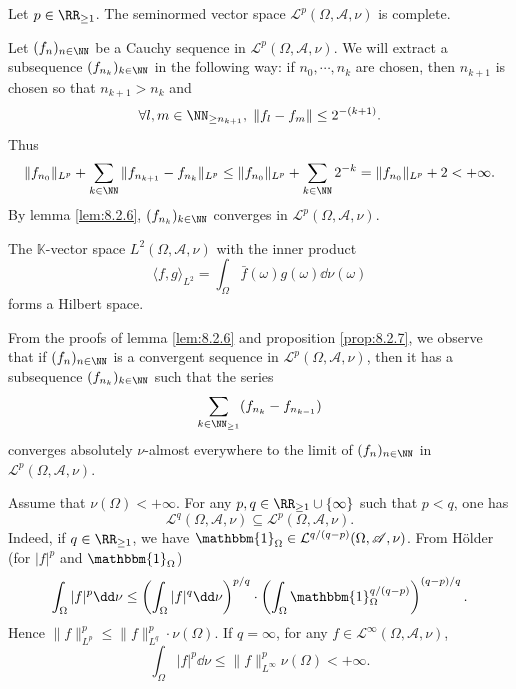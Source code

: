 \begin{propositionenv}\label{prop:8.2.7}
    Let $p \in \RR_{\ge 1}$.
    The seminormed vector space $\mathcal{L}^p(\Omega,\mathscr{A},\nu)$ is complete.
\end{propositionenv}
\begin{proofenv}
    Let $(f_n)_{n \in \NN}$ be a Cauchy sequence in $\mathcal{L}^p(\Omega, \mathscr{A}, \nu)$.
    We will extract a subsequence $(f_{n_{k}})_{k \in \NN}$ in the following way:
    if $n_0,\cdots,n_k$ are chosen, then $n_{k+1}$ is chosen so that $n_{k+1} > n_k$ and
    $$\forall l,m \in \NN_{\ge n_{k+1}}, \; \|f_l - f_m\| \le 2^{-(k+1)}.$$
    Thus
    $$\|f_{n_0}\|_{L^p} + \sum_{k \in \NN} \|f_{n_{k+1}} - f_{n_k}\|_{L^p} \le \|f_{n_0}\|_{L^p} + \sum_{k \in \NN}2^{-k} = \|f_{n_0}\|_{L^p} + 2 < + \infty.$$
    By lemma \ref{lem:8.2.6}, $(f_{n_{k}})_{k \in \NN}$ converges in $\mathcal{L}^p(\Omega,\mathscr{A},\nu)$.
\end{proofenv}

\begin{corollaryenv}
    The $\mathbb{K}$-vector space $L^2(\Omega,\mathscr{A},\nu)$ with the inner product
    $$\langle f,g \rangle_{L^2} = \int_{\Omega} \bar{f}(\omega) g(\omega) \dd \nu(\omega)$$
    forms a Hilbert space.
\end{corollaryenv}
\begin{remark}
    From the proofs of lemma \ref{lem:8.2.6} and proposition \ref{prop:8.2.7},
    we observe that if $(f_n)_{n \in \NN}$ is a convergent sequence in $\mathcal{L}^p(\Omega,\mathscr{A},\nu)$,
    then it has a subsequence $(f_{n_k})_{k \in \NN}$ such that the series
    $$\sum_{k \in \NN_{\ge 1}}(f_{n_{k}} - f_{n_{k-1}})$$
    converges absolutely $\nu$-almost everywhere to the limit of $(f_n)_{n \in \NN}$ in $\mathcal{L}^p(\Omega,\mathscr{A},\nu)$.
\end{remark}

\begin{remark}
    Assume that $\nu(\Omega) < +\infty$.
    For any $p,q \in \RR_{\ge 1} \cup \{\infty\}$ such that $p < q$, one has
    $$\mathcal{L}^q(\Omega,\mathscr{A},\nu) \subseteq \mathcal{L}^p(\Omega,\mathscr{A},\nu).$$
    Indeed, if $q \in \RR_{\ge 1}$, we have $\mathbbm{1}_{\Omega} \in \mathcal{L}^{q/(q - p)}(\Omega,\mathscr{A},\nu)$.
    From Hölder (for $|f|^p$ and $\mathbbm{1}_{\Omega}$)
    $$\int_{\Omega} |f|^p \dd \nu \le \left(\int_{\Omega} |f|^q \dd \nu\right)^{p/q} \cdot \left(\int_{\Omega} \mathbbm{1}_{\Omega}^{q/(q-p)}\right)^{(q-p)/q}.$$
    Hence $\|f\|^{p}_{L^p} \le \|f\|^p_{L^q} \cdot \nu(\Omega)$.
    If $q = \infty$, for any $f \in \mathcal{L}^\infty(\Omega,\mathscr{A},\nu)$,
    $$\int_{\Omega} |f|^p \dd \nu \le \|f\|^p_{L^\infty} \nu(\Omega) < + \infty.$$
\end{remark}


